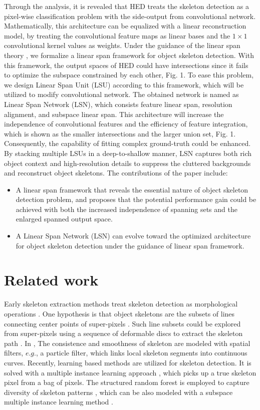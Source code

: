 \documentclass[runningheads]{llncs}
\begin{document}
Through the analysis, it is revealed that HED treats the skeleton detection as a pixel-wise classification problem with the side-output from convolutional network. Mathematically, this architecture can be equalized with a linear reconstruction model, by treating the convolutional feature maps as linear bases and the $1\times1$ convolutional kernel values as weights. Under the guidance of the linear span theory \cite{ref30}, we formalize a linear span framework for object skeleton detection. With this framework, the output spaces of HED could have intersections since it fails to optimize the subspace constrained by each other, Fig. 1. To ease this problem, we design Linear Span Unit (LSU) according to this framework, which will be utilized to modify convolutional network. The obtained network is named as Linear Span Network (LSN), which consists feature linear span, resolution alignment, and subspace linear span. This architecture will increase the independence of convolutional features and the efficiency of feature integration, which is shown as the smaller intersections and the larger union set, Fig. 1. Consequently, the capability of fitting complex ground-truth could be enhanced. By stacking multiple LSUs in a deep-to-shallow manner, LSN captures both rich object context and high-resolution details to suppress the cluttered backgrounds and reconstruct object skeletons.  
The contributions of the paper include: 
\begin{itemize}
     \item A linear span framework that reveals the essential nature of object skeleton detection problem, and proposes that the potential performance gain could be achieved with both the increased independence of spanning sets and the enlarged spanned output space.
     \item A Linear Span Network (LSN) can evolve toward the optimized architecture for 
     object skeleton detection under the guidance of linear span framework.    
\end{itemize}

\section{Related work}

Early skeleton extraction methods treat skeleton detection as morphological operations \cite{ref9,ref10,ref11,ref12,ref13,ref14,ref37}. One hypothesis is that object skeletons are the subsets of lines connecting center points of super-pixels \cite{ref12}. Such line subsets could be explored from super-pixels using a sequence of deformable discs to extract the skeleton path \cite{ref13}. In \cite{ref14}, The consistence and smoothness of skeleton are modeled with spatial filters, $e.g.$, a particle filter, which links local skeleton segments into continuous curves. Recently, learning based methods are utilized for skeleton detection. It is solved with a multiple instance learning approach \cite{ref15}, which picks up a true skeleton pixel from a bag of pixels. The structured random forest is employed to capture diversity of skeleton patterns \cite{ref16}, which can be also modeled with a subspace multiple instance learning method \cite{ref17}.
\end{document}
